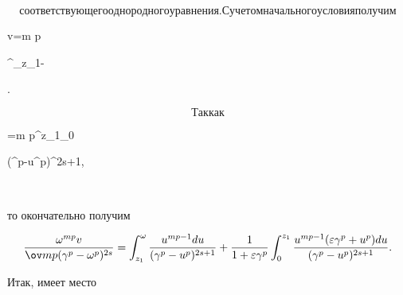 $$ 


соответствующего однородного уравнения. С учетом начального условия 


получим 


$$ 


v=\ov m p 


\int^\omega_{z_1}- 


. 


$$ 


Так как 


$$ 


=\ov m p\int^{z_1}_0 




{(\gamma^p-u^p)^{2s+1}}, 


$$ 


то окончательно получим 


\begin{equation} 


\frac{\omega^{mp}v}{\ov mp(\gamma^p-\omega^p)^{2s}}= 


\int^\omega_{z_1}


\frac{u^{mp-1}du}{(\gamma^p-u^p)^{2s+1}}+ 


\frac{1}{1+\varepsilon\gamma^p}\int^{z_1}_0 


\frac{u^{mp-1}(\varepsilon\gamma^p+u^p)du}{(\gamma^p-u^p)^{2s+1}}. 


\end{equation}  


Итак, имеет место 


 


